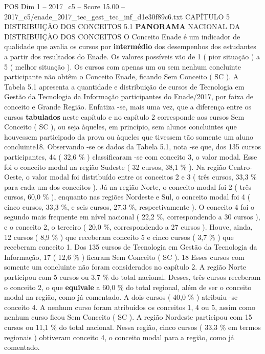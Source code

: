 \begin{textsample}{POS Dim 1 – 2017\_c5 – Score 15.00 – 2017\_c5/enade\_2017\_tec\_gest\_tec\_inf\_d1e30f89c6.txt}  \label{ex:f1_pos_057}
CAPÍTULO 5 DISTRIBUIÇÃO DOS CONCEITOS 5.1 \textbf{PANORAMA} NACIONAL DA DISTRIBUIÇÃO DOS CONCEITOS O Conceito Enade é um indicador de qualidade que avalia os cursos por \textbf{intermédio} dos desempenhos dos estudantes a partir dos resultados do Enade.
Os valores possíveis vão de 1 ( pior situação ) a 5 ( melhor situação ).
Os cursos com apenas um ou sem nenhum concluinte participante não obtêm o Conceito Enade, ficando Sem Conceito ( SC ).
A Tabela 5.1 apresenta a quantidade e distribuição de cursos de Tecnologia em Gestão da Tecnologia da Informação participantes do Enade/2017, por faixa de conceito e Grande Região.
Enfatiza -se, mais uma vez, que a diferença entre os cursos \textbf{tabulados} neste capítulo e no capítulo 2 corresponde aos cursos Sem Conceito ( SC ), ou seja àqueles, em princípio, sem alunos concluintes que houvessem participado da prova ou àqueles que tivessem tão somente um aluno concluinte18.
Observando -se os dados da Tabela 5.1, nota -se que, dos 135 cursos participantes, 44 ( 32,6 \% ) classificaram -se com conceito 3, o valor modal.
Esse foi o conceito modal na região Sudeste ( 32 cursos, 38,1 \% ).
Na região Centro-Oeste, o valor modal foi distribuído entre os conceitos 2 e 3 ( três cursos, 33,3 \% para cada um dos conceitos ).
Já na região Norte, o conceito modal foi 2 ( três cursos, 60,0 \% ), enquanto nas regiões Nordeste e Sul, o conceito modal foi 4 ( cinco cursos, 33,3 \%, e seis cursos, 27,3 \%, respectivamente ).
O conceito 4 foi o segundo mais frequente em nível nacional ( 22,2 \%, correspondendo a 30 cursos ), e o conceito 2, o terceiro ( 20,0 \%, correspondendo a 27 cursos ).
Houve, ainda, 12 cursos ( 8,9 \% ) que receberam conceito 5 e cinco cursos ( 3,7 \% ) que receberam conceito 1.
Dos 135 cursos de Tecnologia em Gestão da Tecnologia da Informação, 17 ( 12,6 \% ) ficaram Sem Conceito ( SC ). 18 Esses cursos com somente um concluinte não foram considerados no capítulo 2.
A região Norte participou com 5 cursos ou 3,7 \% do total nacional.
Desses, três cursos receberam o conceito 2, o que \textbf{equivale} a 60,0 \% do total regional, além de ser o conceito modal na região, como já comentado.
A dois cursos ( 40,0 \% ) atribuiu -se conceito 4.
A nenhum curso foram atribuídos os conceitos 1, 4 ou 5, assim como nenhum curso ficou Sem Conceito ( SC ).
A região Nordeste participou com 15 cursos ou 11,1 \% do total nacional.
Nessa região, cinco cursos ( 33,3 \% em termos regionais ) obtiveram conceito 4, o conceito modal para a região, como já comentado.

\end{textsample}

